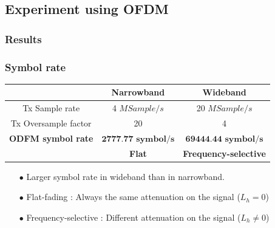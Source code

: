 \documentclass[11pt]{beamer}
\begin{document}
\subsection{Experiment using OFDM}
\subsubsection{Results}

\begin{frame}
\frametitle{Symbol rate}
\begin{center}
	\begin{tabular}{c|c|c}
		  & Narrowband & Wideband\\
		  \hline
	Tx Sample rate & 4 $MSample/s$ & 20 $MSample/s$ \\	  
	Tx Oversample factor & 20 & 4\\
	\textbf{ODFM symbol rate} &  $\textbf{2777.77 symbol/s}$ & $\textbf{69444.44 symbol/s}$ \\ 
	\hline
     & \color{red} \textbf{Flat}  & \color{red} \textbf{Frequency-selective}\\                               
	\end{tabular}
	\label{tab1}
\end{center}



\begin{itemize}
\item[$\bullet$] Larger symbol rate in wideband than in narrowband.
\item[$\bullet$] Flat-fading : Always the same attenuation on the signal ($L_h=0$)
\item[$\bullet$] Frequency-selective : Different attenuation on the signal ($L_h \neq 0$)
\end{itemize}

\end{frame}
\end{document}
